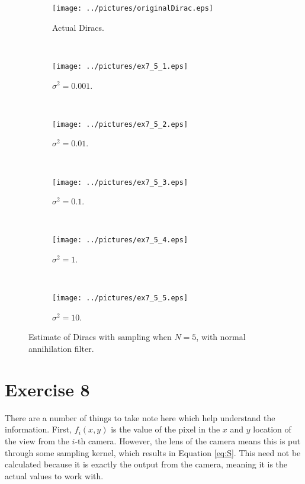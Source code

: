 \documentclass[11pt,a4paper]{report}
\newcommand{\mychapter}[2]
{
    \setcounter{chapter}{#1}
    \setcounter{section}{0}
    \chapter*{#2}
    \addcontentsline{toc}{chapter}{#2}
}
\begin{document}
\begin{figure}[!ht]
    \captionsetup[subfigure]{position=b}
    \centering
    \begin{subfigure}{0.49\textwidth}
        \texttt{[image: ../pictures/originalDirac.eps]}
        \caption{Actual Diracs.}
        \label{fig:ex7_5_0}
    \end{subfigure}
    ~
    \begin{subfigure}{0.49\textwidth}
        \texttt{[image: ../pictures/ex7\_5\_1.eps]}
        \caption{$\sigma^2 = 0.001$.}
        \label{fig:ex7_5_1}
    \end{subfigure}
    \\
    \begin{subfigure}{0.49\textwidth}
        \texttt{[image: ../pictures/ex7\_5\_2.eps]}
        \caption{$\sigma^2 = 0.01$.}
        \label{fig:ex7_5_2}
    \end{subfigure}
    ~
    \begin{subfigure}{0.49\textwidth}
        \texttt{[image: ../pictures/ex7\_5\_3.eps]}
        \caption{$\sigma^2 = 0.1$.}
        \label{fig:ex7_5_3}
    \end{subfigure}
    \\
    \begin{subfigure}{0.49\textwidth}
        \texttt{[image: ../pictures/ex7\_5\_4.eps]}
        \caption{$\sigma^2 = 1$.}
        \label{fig:ex7_5_4}
    \end{subfigure}
    ~
    \begin{subfigure}{0.49\textwidth}
        \texttt{[image: ../pictures/ex7\_5\_5.eps]}
        \caption{$\sigma^2 = 10$.}
        \label{fig:ex7_5_5}
    \end{subfigure}

    \caption{Estimate of Diracs with sampling when $N = 5$, with normal annihilation filter.}
    \label{fig:ex7_5}
\end{figure}

\mychapter{8}{Exercise 8}
There are a number of things to take note here which help understand the information. First, $f_i(x,y)$ is the value of the pixel in the $x$ and $y$ location of the view from the $i$-th camera. However, the lens of the camera means this is put through some sampling kernel, which results in Equation \ref{eq:S}. This need not be calculated because it is exactly the output from the camera, meaning it is the actual values to work with.
\end{document}
